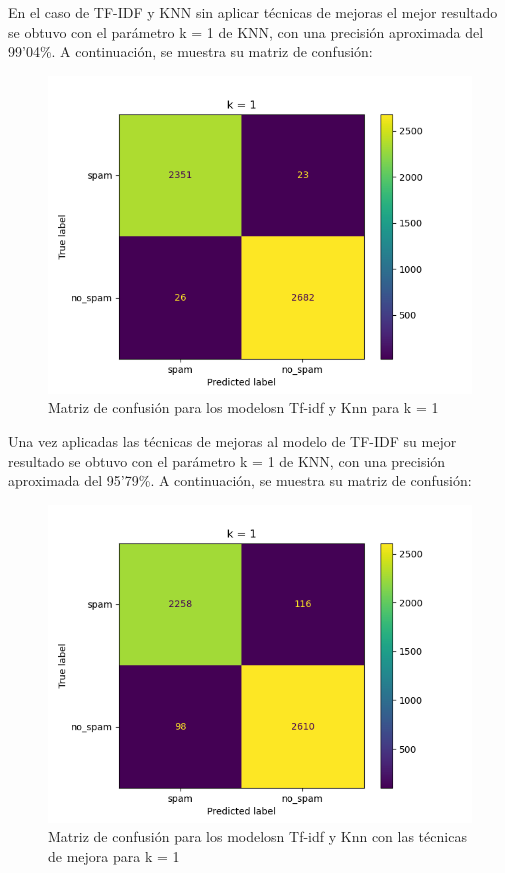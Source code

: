 \documentclass[conference,a4paper]{IEEEtran}
\begin{document}
En el caso de TF-IDF y KNN sin aplicar técnicas de mejoras el mejor resultado se obtuvo con el parámetro k = 1 de KNN, con una precisión aproximada del 99’04\%. A continuación, se muestra su matriz de confusión:



\begin{figure}[hbtp]
\caption{Matriz de confusión para los modelosn Tf-idf y Knn para k = 1}
\centering
\includegraphics[scale=0.50]{tf-idf.png}
\end{figure}


Una vez aplicadas las técnicas de mejoras al modelo de TF-IDF su mejor resultado se obtuvo con el parámetro k = 1 de KNN, con una precisión aproximada del 95’79\%. A continuación, se muestra su matriz de confusión:

\begin{figure}[hbtp]
\caption{Matriz de confusión para los modelosn Tf-idf y Knn con las técnicas de mejora para k = 1}
\centering
\includegraphics[scale=0.50]{tf-idfCM.png}
\end{figure}
\end{document}
